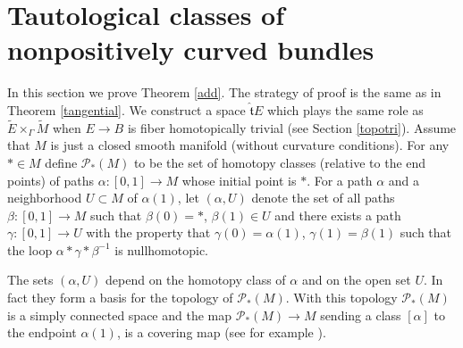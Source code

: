 \documentclass[onecolumn,notitlepage,11pt]{article}
\newcommand{\p}{\mathcal{P}}
\theoremstyle{definition}
\begin{document}
\section{Tautological classes of nonpositively curved
bundles}\label{nonpositively}
In this section we prove Theorem \ref{add}. The strategy of proof
is the same as in Theorem \ref{tangential}. We construct
a space $\widehat{\mathfrak{t}}E$ which plays
the same role as $\widetilde{E}\times_{\Gamma}\widetilde{M}$ when
$E\to B$ is fiber homotopically trivial (see Section \ref{topotri}).
Assume that $M$ is just a closed smooth manifold 
(without curvature conditions).
For any
$\ast\in M$ define $\p_{\ast}(M)$ to be the set of homotopy classes 
(relative to the end points) of paths $\alpha:[0,1]\to M$ whose initial
point is $\ast$. For a path $\alpha$ and a neighborhood $U\subset M$ of 
$\alpha(1)$, let $(\alpha,U)$ denote the set of all paths 
$\beta:[0,1]\to M$ such that $\beta(0)=\ast$, $\beta(1)\in U$ and
there exists a path $\gamma:[0,1]\to U$ with the property that 
$\gamma(0)=\alpha(1)$, $\gamma(1)=\beta(1)$ such that the loop
$\alpha\ast\gamma\ast\beta^{-1}$ is nullhomotopic.

The sets $(\alpha,U)$ depend on the homotopy class of $\alpha$
and on the open set $U$. In fact they form a basis for the topology of 
$\p_{\ast}(M)$. With this topology $\p_{\ast}(M)$ is a simply connected
space and the map 
$\p_{\ast}(M)\to M$ sending a class $[\alpha]$ to the endpoint
$\alpha(1)$, is a covering map (see for example 
\cite[I.6]{greenberg}).
\end{document}
